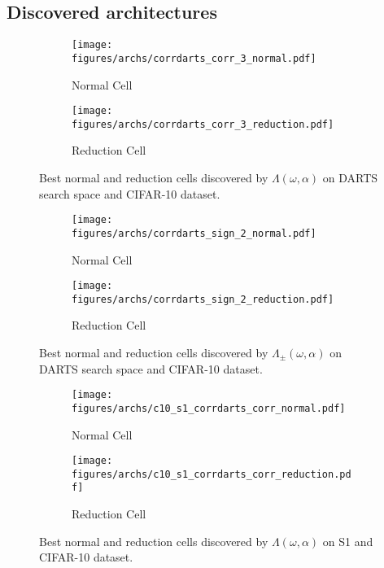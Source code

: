 \documentclass{article} \usepackage{fancyhdr, iclr2023_conference, times}
\begin{document}
\subsection{Discovered architectures}
\label{appndx:archs}
\begin{figure}[h]
    \centering
    \begin{subfigure}[h]{0.5\textwidth}
        \centering
        \texttt{[image: figures/archs/corrdarts\_corr\_3\_normal.pdf]}
        \caption{Normal Cell}
    \end{subfigure}\begin{subfigure}[h]{0.5\textwidth}
        \centering
        \texttt{[image: figures/archs/corrdarts\_corr\_3\_reduction.pdf]}
        \caption{Reduction Cell}
    \end{subfigure}
    \caption{Best normal and reduction cells discovered by $\Lambda(\omega, \alpha)$ on DARTS search space and CIFAR-10 dataset.}
\end{figure}
\begin{figure}[h]
    \centering
    \begin{subfigure}[h]{0.5\textwidth}
        \centering
        \texttt{[image: figures/archs/corrdarts\_sign\_2\_normal.pdf]}
        \caption{Normal Cell}
    \end{subfigure}\begin{subfigure}[h]{0.5\textwidth}
        \centering
        \texttt{[image: figures/archs/corrdarts\_sign\_2\_reduction.pdf]}
        \caption{Reduction Cell}
    \end{subfigure}
    \caption{Best normal and reduction cells discovered by $\Lambda_\pm(\omega, \alpha)$ on DARTS search space and CIFAR-10 dataset.}
\end{figure}
\begin{figure}[h]
    \centering
    \begin{subfigure}[h]{0.5\textwidth}
        \centering
        \texttt{[image: figures/archs/c10\_s1\_corrdarts\_corr\_normal.pdf]}
        \caption{Normal Cell}
    \end{subfigure}\begin{subfigure}[h]{0.5\textwidth}
        \centering
        \texttt{[image: figures/archs/c10\_s1\_corrdarts\_corr\_reduction.pdf]}
        \caption{Reduction Cell}
    \end{subfigure}
    \caption{Best normal and reduction cells discovered by $\Lambda(\omega, \alpha)$ on S1 and CIFAR-10 dataset.}
\end{figure}
\end{document}
